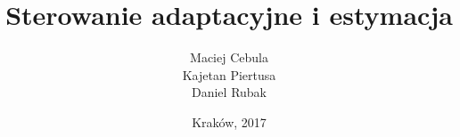 \documentclass[12pt]{report}
\title{\textbf{Sterowanie adaptacyjne i estymacja}}
\author{Maciej Cebula \\Kajetan Piertusa \\ Daniel Rubak}
\date{Kraków, 2017}
\begin{document}
	
	

	
	\setcounter{tocdepth}{2}
	
	\maketitle
	\tableofcontents
	\clearpage
		
		\renewcommand{\tablename}{Tabela}
		\renewcommand{\figurename}{Rys.}
		
	
	
	

	
	
	
\end{document}
